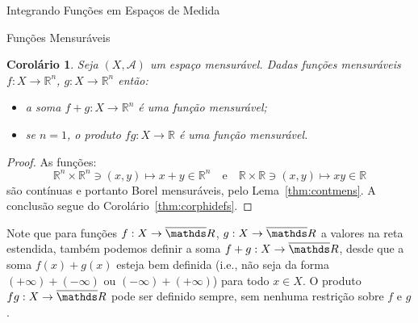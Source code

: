 \documentclass[oneside,final,11pt]{amsbook}
\newcommand{\R}{\mathds R}
\theoremstyle{remark}\newtheorem{exercise}{Exercício}[chapter]
\theoremstyle{remark}\newtheorem{*exercise}[exercise]{\hbox to 0pt{\hskip 0pt minus 1fil*}Exercício}
\theoremstyle{definition}\newtheorem{exdefin}{Definição}[chapter]
\theoremstyle{plain}\newtheorem{teo}{Teorema}[section]
\theoremstyle{plain}\newtheorem{lem}[teo]{Lema}
\theoremstyle{plain}\newtheorem{prop}[teo]{Proposição}
\theoremstyle{plain}\newtheorem{cor}[teo]{Corolário}
\theoremstyle{definition}\newtheorem{defin}[teo]{Definição}
\theoremstyle{remark}\newtheorem{rem}[teo]{Observação}
\theoremstyle{definition}\newtheorem{notation}[teo]{Notação}
\theoremstyle{definition}\newtheorem{convention}[teo]{Convenção}
\theoremstyle{definition}\newtheorem{example}[teo]{Exemplo}
\numberwithin{section}{chapter}
\numberwithin{equation}{section}
\begin{document}
\begin{chapter}{Integrando Funções em Espaços de Medida}
\begin{section}{Funções Mensuráveis}
\begin{cor}\label{thm:corsomaprodmens}
Seja $(X,\mathcal A)$ um espaço mensurável. Dadas funções mensuráveis $f:X\to\R^n$, $g:X\to\R^n$
então:
\begin{itemize}
\item a soma $f+g:X\to\R^n$ é uma função mensurável;
\item se $n=1$, o produto $fg:X\to\R$ é uma função mensurável.
\end{itemize}
\end{cor}
\begin{proof}
As funções:
\[\R^n\times\R^n\ni(x,y)\longmapsto x+y\in\R^n\quad\text{e}\quad\R\times\R\ni(x,y)\longmapsto xy\in\R\]
são contínuas e portanto Borel mensuráveis, pelo Lema~\ref{thm:contmens}. A conclusão
segue do Corolário~\ref{thm:corphidefs}.
\end{proof}

Note que para funções $f:X\to\overline\R$, $g:X\to\overline\R$ a valores na reta estendida, também podemos
definir a soma $f+g:X\to\overline\R$,
desde que a soma $f(x)+g(x)$ esteja bem definida (i.e., não seja da forma
$(+\infty)+(-\infty)$ ou $(-\infty)+(+\infty)$) para todo $x\in X$. O produto $fg:X\to\overline\R$
pode ser definido sempre, sem nenhuma restrição sobre $f$ e $g$.


\end{section}
\end{chapter}
\end{document}
